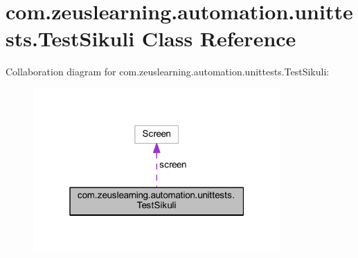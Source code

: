 \hypertarget{classcom_1_1zeuslearning_1_1automation_1_1unittests_1_1TestSikuli}{}\section{com.\+zeuslearning.\+automation.\+unittests.\+Test\+Sikuli Class Reference}
\label{classcom_1_1zeuslearning_1_1automation_1_1unittests_1_1TestSikuli}


Collaboration diagram for com.\+zeuslearning.\+automation.\+unittests.\+Test\+Sikuli\+:\nopagebreak
\begin{figure}[H]
\begin{center}
\leavevmode
\includegraphics[width=268pt]{df/d64/classcom_1_1zeuslearning_1_1automation_1_1unittests_1_1TestSikuli__coll__graph}
\end{center}
\end{figure}
